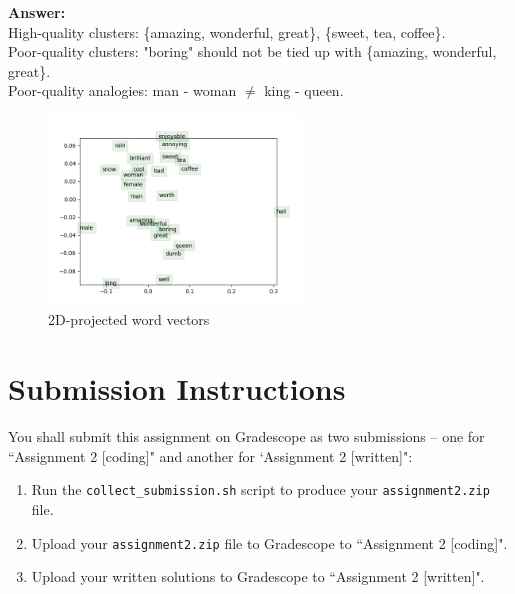 \documentclass{article}
\newenvironment{answer}{
    {\bf Answer:} \sf \begingroup\color{black}
}{\endgroup}%
\begin{document}
\begin{enumerate}[label=(\alph*)]
          \begin{shaded}
              \begin{answer} \\
                High-quality clusters: \{amazing, wonderful, great\}, \{sweet, tea, coffee\}. \\
                Poor-quality clusters: "boring" should not be tied up with \{amazing, wonderful, great\}. \\
                Poor-quality analogies: man - woman $ \neq$ king - queen. 
              \end{answer}

          \end{shaded}
          \begin{figure}[h]
              \centering
              \includegraphics[width=0.6\textwidth]{word_vectors.png}
              \caption{2D-projected word vectors}
              \label{fig:ss}
          \end{figure}
          \section{Submission Instructions}
          You shall submit this assignment on Gradescope as two submissions -- one for ``Assignment 2 [coding]" and another for `Assignment 2 [written]":
          \begin{enumerate}
              \item Run the \texttt{collect\_submission.sh} script to produce your \texttt{assignment2.zip} file.
              \item Upload your \texttt{assignment2.zip} file to Gradescope to ``Assignment 2 [coding]".
              \item Upload your written solutions to Gradescope to ``Assignment 2 [written]".
          \end{enumerate}

\end{enumerate}
\end{document}
